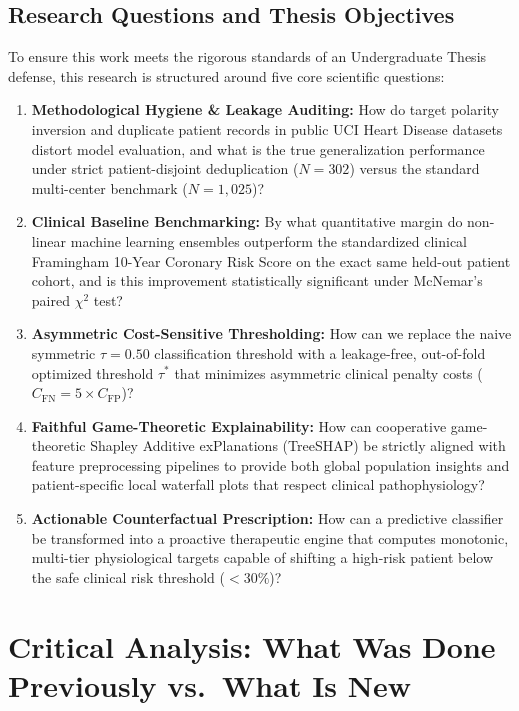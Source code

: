 \documentclass[12pt,a4paper]{report}
\begin{document}
\section{Research Questions and Thesis Objectives}
To ensure this work meets the rigorous standards of an Undergraduate Thesis defense, this research is structured around five core scientific questions:
\begin{enumerate}[label=\textbf{RQ\arabic*:}, leftmargin=1.4cm]
    \item \textbf{Methodological Hygiene \& Leakage Auditing:} How do target polarity inversion and duplicate patient records in public UCI Heart Disease datasets distort model evaluation, and what is the true generalization performance under strict patient-disjoint deduplication ($N=302$) versus the standard multi-center benchmark ($N=1,025$)?
    \item \textbf{Clinical Baseline Benchmarking:} By what quantitative margin do non-linear machine learning ensembles outperform the standardized clinical Framingham 10-Year Coronary Risk Score on the exact same held-out patient cohort, and is this improvement statistically significant under McNemar's paired $\chi^2$ test?
    \item \textbf{Asymmetric Cost-Sensitive Thresholding:} How can we replace the naive symmetric $\tau=0.50$ classification threshold with a leakage-free, out-of-fold optimized threshold $\tau^*$ that minimizes asymmetric clinical penalty costs ($C_{\text{FN}} = 5 \times C_{\text{FP}}$)?
    \item \textbf{Faithful Game-Theoretic Explainability:} How can cooperative game-theoretic Shapley Additive exPlanations (TreeSHAP) be strictly aligned with feature preprocessing pipelines to provide both global population insights and patient-specific local waterfall plots that respect clinical pathophysiology?
    \item \textbf{Actionable Counterfactual Prescription:} How can a predictive classifier be transformed into a proactive therapeutic engine that computes monotonic, multi-tier physiological targets capable of shifting a high-risk patient below the safe clinical risk threshold ($<30\%$)?
\end{enumerate}

\chapter[Prior Work vs.\ What Is New]{Critical Analysis: What Was Done Previously vs.\ What Is New}
\end{document}
